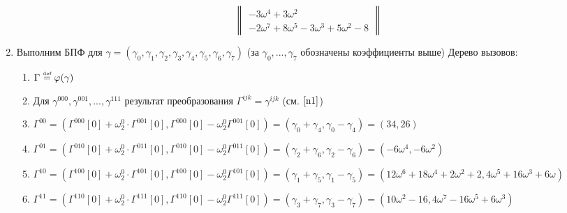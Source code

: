\documentclass[a4paper]{article}
\def\eqdef{\overset{\mbox{\tiny def}}{=}}
\begin{document}
\begin{enumerate}
$$\begin{Vmatrix}
-3\omega^4+3\omega^2\\
-2\omega^7+8\omega^5-3\omega^3+5\omega^2-8
\end{Vmatrix}
$$
\item Выполним БПФ для $\gamma=(\gamma_0,\gamma_1,\gamma_2,\gamma_3,\gamma_4,\gamma_5,\gamma_6,\gamma_7)$ (за $\gamma_0,...,\gamma_7$ обозначены коэффициенты выше) Дерево вызовов:\newline
{}
\begin{enumerate}
\item $\Gamma\eqdef\varphi(\gamma)$
\item Для $\gamma^{000}, \gamma^{001}, ..., \gamma^{111}$ результат преобразования $\Gamma^{ijk}=\gamma^{ijk}$ (см. $\ref{n1}$)
\item $\Gamma^{00}=(\Gamma^{000}[0]+\omega_2^0\cdot \Gamma^{001}[0],\Gamma^{000}[0]-\omega_2^0\Gamma^{001}[0])=(\gamma_0+\gamma_4,\gamma_0-\gamma_4)=(34,26)$
\item $\Gamma^{01}=(\Gamma^{010}[0]+\omega_2^0\cdot \Gamma^{011}[0],\Gamma^{010}[0]-\omega_2^0\Gamma^{011}[0])=(\gamma_2+\gamma_6,\gamma_2-\gamma_6)=(-6\omega^4,-6\omega^2)$
\item $\Gamma^{10}=(\Gamma^{100}[0]+\omega_2^0\cdot \Gamma^{101}[0],\Gamma^{100}[0]-\omega_2^0\Gamma^{101}[0])=(\gamma_1+\gamma_5,\gamma_1-\gamma_5)=(12\omega^6+18\omega^4+2\omega^2+2,4\omega^5+16\omega^3+6\omega)$
\item $\Gamma^{11}=(\Gamma^{110}[0]+\omega_2^0\cdot \Gamma^{111}[0],\Gamma^{110}[0]-\omega_2^0\Gamma^{111}[0])=(\gamma_3+\gamma_7,\gamma_3-\gamma_7)=(10\omega^2-16,4\omega^7-16\omega^5+6\omega^3)$


\end{enumerate}
\end{enumerate}
\end{document}
